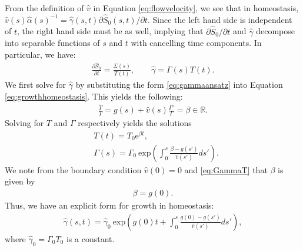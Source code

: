 From the definition of $\hat v$ in Equation \eqref{eq:flowvelocity}, we see that in homeostasis, $\hat v(s)\hat\alpha(s)^{-1}=\hat\gamma(s,t)\partial\hat{S}_0(s,t)/\partial t$. Since the left hand side is independent of $t$, the right hand side must be as well, implying that $\partial\hat{S}_0/\partial t$ and $\hat{\gamma}$ decompose into separable functions of $s$ and $t$ with cancelling time components. In particular, we have:
\begin{align}
\frac{\partial\hat{S}_0}{\partial t}= \frac{\Sigma(s)}{T(t)}, \qquad \hat{\gamma} = \Gamma(s)T(t). \label{eq:gammaansatz}
\end{align}
We first solve for $\hat{\gamma}$ by substituting the form \eqref{eq:gammaansatz} into Equation \eqref{eq:growthhomeostasis}. This yields the following:
\begin{align}
\frac{\dot{T}}{T} = g(s) + \hat{v}(s)\frac{\Gamma'}{\Gamma} = \beta \in \mathbb{R}.\label{eq:GammaT}
\end{align}
Solving for $T$ and $\Gamma$ respectively yields the solutions	
\begin{align}
&T(t) = T_0\mathrm{e}^{\beta t},\\
&\Gamma(s) = \Gamma_0\ \mathrm{exp}\left(\int^s_0\frac{\beta - g(s')}{\hat{v}(s')}ds'\right).
\end{align}
We note from the boundary condition $\hat{v}(0) = 0$ and \eqref{eq:GammaT} that  $\beta$ is given by
\begin{align}
\beta = g(0).\label{eq:betacondition}
\end{align}
Thus, we have an explicit form for growth in homeostasis:
\begin{align}
\hat{\gamma}(s, t) = \hat{\gamma}_0\ \mathrm{exp}\left(g(0)t + \int^s_0\frac{g(0) - g(s')}{\hat{v}(s')}ds'\right),\label{eq:gammasolhomeostasis}
\end{align}
where $\hat{\gamma}_0 = \Gamma_0T_0$ is a constant.%

